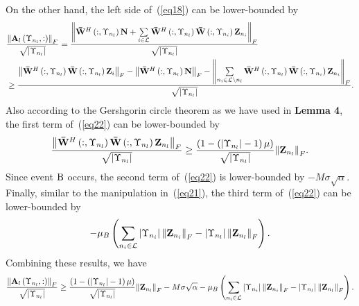 \documentclass[a4paper,12pt]{article}
\begin{document}
{\begin{framed}
{On the other hand, the left side of~(\ref{eq18}) can be lower-bounded by
\begin{align}\label{eq22}
&\frac{{{{\left\| {{{\bf{A}}_l}\left( {{\Upsilon _{{n_l}}},:} \right)} \right\|}_F}}}{{\sqrt {\left| {{\Upsilon _{{n_l}}}} \right|} }} = \frac{{{{\left\| {{{{\bf{\bar W}}}^H}\left( {:,{\Upsilon _{{n_l}}}} \right){\bf{N}} + \sum\limits_{i \in {\cal L}} {{{{\bf{\bar W}}}^H}\left( {:,{\Upsilon _{{n_l}}}} \right){\bf{\bar W}}\left( {:,{\Upsilon _{{n_i}}}} \right){{\bf{Z}}_{{n_i}}}} } \right\|}_F}}}{{\sqrt {\left| {{\Upsilon _{{n_l}}}} \right|} }}\\ \nonumber
& \ge \frac{{{{\left\| {{{{\bf{\bar W}}}^H}\left( {:,{\Upsilon _{{n_l}}}} \right){\bf{\bar W}}\left( {:,{\Upsilon _{{n_l}}}} \right){{\bf{Z}}_i}} \right\|}_F} - {{\left\| {{{{\bf{\bar W}}}^H}\left( {:,{\Upsilon _{{n_l}}}} \right){\bf{N}}} \right\|}_F} - {{\left\| {\sum\limits_{{n_i} \in {\cal L}\backslash {n_l}} {{{{\bf{\bar W}}}^H}\left( {:,{\Upsilon _{{n_l}}}} \right){\bf{\bar W}}\left( {:,{\Upsilon _{{n_i}}}} \right){{\bf{Z}}_{{n_i}}}} } \right\|}_F}}}{{\sqrt {\left| {{\Upsilon _{{n_l}}}} \right|} }}.
\end{align}
Also according to the Gershgorin circle theorem as we have used in \textbf{Lemma 4}, the first term of~(\ref{eq22}) can be lower-bounded by
\begin{equation}\label{eq23}
\frac{{{{\left\| {{{{\bf{\bar W}}}^H}\left( {:,{\Upsilon _{{n_l}}}} \right){\bf{\bar W}}\left( {:,{\Upsilon _{{n_l}}}} \right){{\bf{Z}}_{{n_l}}}} \right\|}_F}}}{{\sqrt {\left| {{\Upsilon _{{n_l}}}} \right|} }} \ge \frac{{\left( {1 - \left( {\left| {{\Upsilon _{{n_l}}}} \right| - 1} \right)\mu } \right)}}{{\sqrt {\left| {{\Upsilon _{{n_l}}}} \right|} }}{\left\| {{{\bf{Z}}_{{n_l}}}} \right\|_F}.
\end{equation}
Since event ${{\rm{B}}}$ occurs, the second term of~(\ref{eq22}) is lower-bounded by ${- M\sigma \sqrt \alpha }$. Finally, similar to the manipulation in~(\ref{eq21}), the third term of~(\ref{eq22}) can be lower-bounded by
\begin{equation}\label{eq24}
- {\mu _B}\left( {\sum\limits_{{n_i} \in {\cal L}} {\left| {{\Upsilon _{{n_i}}}} \right|{{\left\| {{{\bf{Z}}_{{n_i}}}} \right\|}_F} - \left| {{\Upsilon _{{n_l}}}} \right|{{\left\| {{{\bf{Z}}_{{n_l}}}} \right\|}_F}} } \right).
\end{equation}
Combining these results, we have
\begin{equation}\label{eq25}
\frac{{{{\left\| {{{\bf{A}}_l}\left( {{\Upsilon _{{n_l}}},:} \right)} \right\|}_F}}}{{\sqrt {\left| {{\Upsilon _{{n_l}}}} \right|} }} \ge \frac{{\left( {1 - \left( {\left| {{\Upsilon _{{n_l}}}} \right| - 1} \right)\mu } \right)}}{{\sqrt {\left| {{\Upsilon _{{n_l}}}} \right|} }}{\left\| {{{\bf{Z}}_{{n_l}}}} \right\|_F} - M\sigma \sqrt \alpha   - {\mu _B}\left( {\sum\limits_{{n_i} \in {\cal L}} {\left| {{\Upsilon _{{n_i}}}} \right|{{\left\| {{{\bf{Z}}_{{n_i}}}} \right\|}_F} - \left| {{\Upsilon _{{n_l}}}} \right|{{\left\| {{{\bf{Z}}_{{n_l}}}} \right\|}_F}} } \right).

\end{equation}}
\end{framed}}
\end{document}

